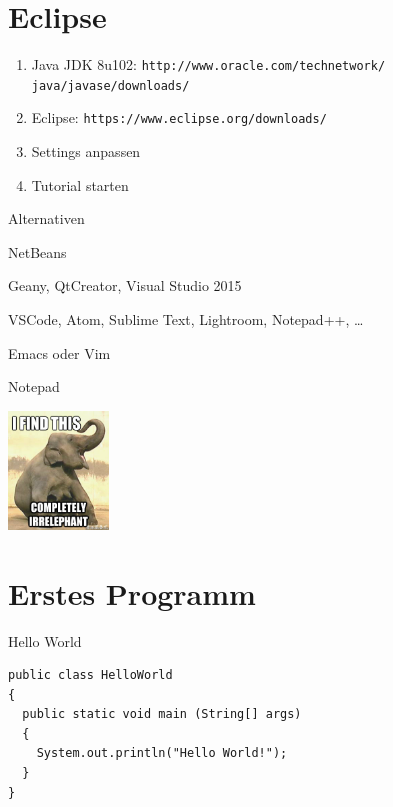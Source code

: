 \documentclass{beamer}
\begin{document}
\section{Eclipse}
\begin{frame}
\begin{enumerate}
\item Java JDK 8u102: \texttt{http://www.oracle.com/technetwork/ java/javase/downloads/}
\item Eclipse: \texttt{https://www.eclipse.org/downloads/}
\item Settings anpassen
\item Tutorial starten
\end{enumerate}

\end{frame}

\begin{frame}{Alternativen}
\begin{description}[align=left]
\item[Java IDEs:] NetBeans
\item[Allgemeine IDEs:] Geany, QtCreator, Visual Studio 2015
\item[Editoren:] VSCode, Atom, Sublime Text, Lightroom, Notepad++, \dots
\item[Harte Editoren:] Emacs oder Vim
\item[Hardmode:] Notepad
\end{description}
\vfill

\hfill\includegraphics[width=0.2\textwidth]{img/irrelephant.jpg}
\end{frame}

\section{Erstes Programm}
\begin{frame}[fragile]{Hello World}
\begin{lstlisting}
public class HelloWorld 
{ 
  public static void main (String[] args)
  {
    System.out.println("Hello World!");
  }
}
\end{lstlisting}
\end{frame}
\end{document}
